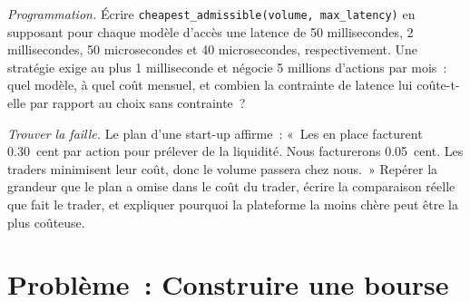 \begin{exercise}[$\star\star\star$]\label{exo:m1:exchanges-brokers-venues:7}
\emph{Programmation.} Écrire \texttt{cheapest\_admissible(volume, max\_latency)}
en supposant pour chaque modèle d'accès une latence de 50 millisecondes, 2 millisecondes,
50 microsecondes et 40 microsecondes, respectivement. Une stratégie exige au plus
1 milliseconde et négocie 5 millions d'actions par mois~: quel modèle, à quel
coût mensuel, et combien la contrainte de latence lui coûte-t-elle par rapport au choix
sans contrainte~?
\end{exercise}

\begin{exercise}[$\star\star\star$]\label{exo:m1:exchanges-brokers-venues:8}
\emph{Trouver la faille.} Le plan d'une start-up affirme~: «~Les  en place facturent
0.30~cent par action pour prélever de la liquidité. Nous facturerons 0.05~cent. Les
traders minimisent leur coût, donc le volume passera chez nous.~» Repérer la grandeur que le plan a omise
dans le coût du trader, écrire la comparaison réelle que fait le trader, et
expliquer pourquoi la plateforme la moins chère peut être la plus coûteuse.
\end{exercise}

\section{Problème~: Construire une bourse}

